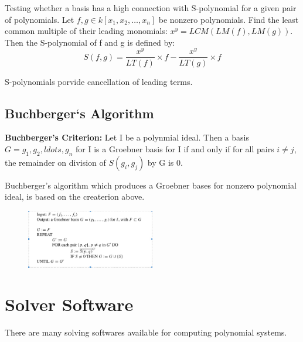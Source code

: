 \documentclass[11pt]{article}
\begin{document}
Testing whether a basis has a high connection with S-polynomial for a given pair of polynomials. Let $f,g \in k[x_1,x_2,\ldots,x_n]$ be nonzero polynomials. Find the least common multiple of their leading monomials: $x^y = LCM(LM(f),LM(g))$. Then the S-polynomial of f and g is defined by:
\begin{equation}
  S(f,g) = \frac{x^y}{LT(f)}\times{f} - \frac{x^y}{LT(g)}\times{f}
\end{equation}

S-polynomials porvide cancellation of leading terms.

\subsection{Buchberger`s Algorithm}
\textbf{Buchberger's Criterion:} Let I be a polynmial ideal. Then a basis $G = {g_1,g_2, ldots, g_n}$ for I is a Groebner basis for I if and only if for all pairs $i \neq j$, the remainder on division of $S(g_i,g_j)$ by G is 0.

Buchberger's algorithm which produces a Groebner bases for nonzero polynomial ideal, is based on the createrion above.

\begin{figure}[H]
  \begin{center}
    \includegraphics[width=0.50\textwidth]{Buchberger.jpg}
    \caption{}
    \label{fig: }
  \end{center}
\end{figure}


\section{Solver Software}
There are many solving softwares available for computing polynomial systems.
\end{document}

